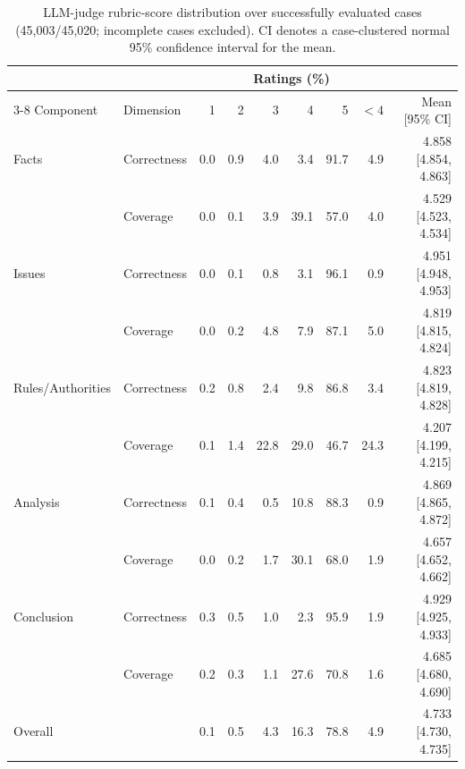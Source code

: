 \begin{table}[t]
\centering
\scriptsize
\setlength{\tabcolsep}{4pt}
\caption{LLM-judge rubric-score distribution over successfully evaluated cases (45,003/45,020; incomplete cases excluded). CI denotes a case-clustered normal 95\% confidence interval for the mean.}
\label{tab:llm_likert}
\begin{tabular}{@{}llrrrrrrr@{}}
\toprule
 & & \multicolumn{6}{c}{Ratings (\%)} & \\
\cmidrule(lr){3-8}
Component & Dimension & 1 & 2 & 3 & 4 & 5 & $<4$ & Mean [95\% CI] \\
\midrule
Facts & Correctness & 0.0 & 0.9 & 4.0 & 3.4 & 91.7 & 4.9 & 4.858 [4.854, 4.863] \\
 & Coverage & 0.0 & 0.1 & 3.9 & 39.1 & 57.0 & 4.0 & 4.529 [4.523, 4.534] \\
Issues & Correctness & 0.0 & 0.1 & 0.8 & 3.1 & 96.1 & 0.9 & 4.951 [4.948, 4.953] \\
 & Coverage & 0.0 & 0.2 & 4.8 & 7.9 & 87.1 & 5.0 & 4.819 [4.815, 4.824] \\
Rules/Authorities & Correctness & 0.2 & 0.8 & 2.4 & 9.8 & 86.8 & 3.4 & 4.823 [4.819, 4.828] \\
 & Coverage & 0.1 & 1.4 & 22.8 & 29.0 & 46.7 & 24.3 & 4.207 [4.199, 4.215] \\
Analysis & Correctness & 0.1 & 0.4 & 0.5 & 10.8 & 88.3 & 0.9 & 4.869 [4.865, 4.872] \\
 & Coverage & 0.0 & 0.2 & 1.7 & 30.1 & 68.0 & 1.9 & 4.657 [4.652, 4.662] \\
Conclusion & Correctness & 0.3 & 0.5 & 1.0 & 2.3 & 95.9 & 1.9 & 4.929 [4.925, 4.933] \\
 & Coverage & 0.2 & 0.3 & 1.1 & 27.6 & 70.8 & 1.6 & 4.685 [4.680, 4.690] \\
\midrule
Overall &  & 0.1 & 0.5 & 4.3 & 16.3 & 78.8 & 4.9 & 4.733 [4.730, 4.735] \\
\bottomrule
\end{tabular}
\end{table}

